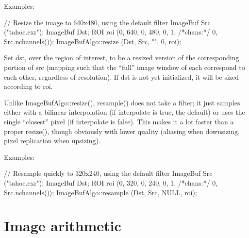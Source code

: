 \smallskip
\noindent Examples:
\begin{code}
    // Resize the image to 640x480, using the default filter
    ImageBuf Src ("tahoe.exr");
    ImageBuf Dst;
    ROI roi (0, 640, 0, 480, 0, 1, /*chans:*/ 0, Src.nchannels());
    ImageBufAlgo::resize (Dst, Src, "", 0, roi);
\end{code}
\apiend


 
Set {\cf dst}, over the region of interest, to be a resized version of the
corresponding portion of {\cf src} (mapping such that the ``full'' image
window of each correspond to each other, regardless of resolution).  If
{\cf dst} is not yet initialized, it will be sized according to {\cf roi}.

Unlike {\cf ImageBufAlgo::resize()}, {\cf resample()} does not take a filter; it
just samples either with a bilinear interpolation (if {\cf interpolate} is
{\cf true}, the default) or uses the single ``closest'' pixel (if
{\cf interpolate} is {\cf false}).  This makes it a lot faster than a proper
{\cf resize()}, though obviously with lower quality (aliasing when
downsizing, pixel replication when upsizing).

\smallskip
\noindent Examples:
\begin{code}
    // Resample quickly to 320x240, using the default filter
    ImageBuf Src ("tahoe.exr");
    ImageBuf Dst;
    ROI roi (0, 320, 0, 240, 0, 1, /*chans:*/ 0, Src.nchannels());
    ImageBufAlgo::resample (Dst, Src, NULL, roi);
\end{code}
\apiend



\section{Image arithmetic}
\label{sec:iba:arith}

 

